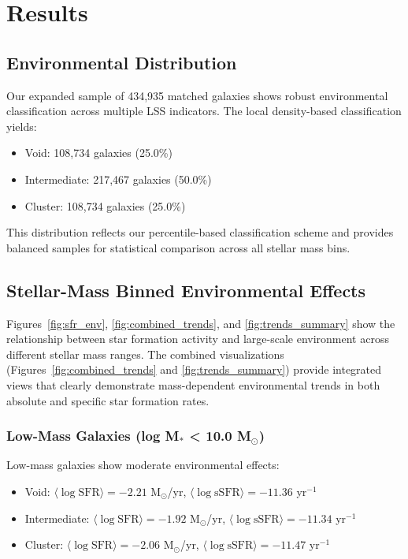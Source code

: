 \documentclass[twocolumn]{aastex701}
\begin{document}
\section{Results}

\subsection{Environmental Distribution}

Our expanded sample of 434,935 matched galaxies shows robust environmental classification across multiple LSS indicators. The local density-based classification yields:
\begin{itemize}
\item Void: 108,734 galaxies (25.0\%)
\item Intermediate: 217,467 galaxies (50.0\%)
\item Cluster: 108,734 galaxies (25.0\%)
\end{itemize}

This distribution reflects our percentile-based classification scheme and provides balanced samples for statistical comparison across all stellar mass bins.

\subsection{Stellar-Mass Binned Environmental Effects}

Figures~\ref{fig:sfr_env}, \ref{fig:combined_trends}, and \ref{fig:trends_summary} show the relationship between star formation activity and large-scale environment across different stellar mass ranges. The combined visualizations (Figures~\ref{fig:combined_trends} and \ref{fig:trends_summary}) provide integrated views that clearly demonstrate mass-dependent environmental trends in both absolute and specific star formation rates.

\subsubsection{Low-Mass Galaxies (log M$_*$ < 10.0 M$_\odot$)}

Low-mass galaxies show moderate environmental effects:
\begin{itemize}
\item Void: $\langle \log \text{SFR} \rangle = -2.21$ M$_\odot$/yr, $\langle \log \text{sSFR} \rangle = -11.36$ yr$^{-1}$
\item Intermediate: $\langle \log \text{SFR} \rangle = -1.92$ M$_\odot$/yr, $\langle \log \text{sSFR} \rangle = -11.34$ yr$^{-1}$
\item Cluster: $\langle \log \text{SFR} \rangle = -2.06$ M$_\odot$/yr, $\langle \log \text{sSFR} \rangle = -11.47$ yr$^{-1}$
\end{itemize}
\end{document}
